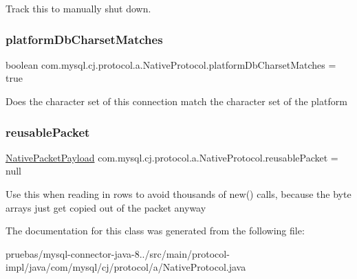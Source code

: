 Track this to manually shut down. \mbox{\label{classcom_1_1mysql_1_1cj_1_1protocol_1_1a_1_1_native_protocol_af023799e47c29f6821440c5b60fba820}} 
\subsubsection{\texorpdfstring{platform\+Db\+Charset\+Matches}{platformDbCharsetMatches}}
{\footnotesize\ttfamily boolean com.\+mysql.\+cj.\+protocol.\+a.\+Native\+Protocol.\+platform\+Db\+Charset\+Matches = true\hspace{0.3cm}{\ttfamily [protected]}}

Does the character set of this connection match the character set of the platform \mbox{\label{classcom_1_1mysql_1_1cj_1_1protocol_1_1a_1_1_native_protocol_a3cbc16a90deb548d74da81685a49216d}} 
\subsubsection{\texorpdfstring{reusable\+Packet}{reusablePacket}}
{\footnotesize\ttfamily \mbox{\hyperlink{classcom_1_1mysql_1_1cj_1_1protocol_1_1a_1_1_native_packet_payload}{Native\+Packet\+Payload}} com.\+mysql.\+cj.\+protocol.\+a.\+Native\+Protocol.\+reusable\+Packet = null\hspace{0.3cm}{\ttfamily [protected]}}

Use this when reading in rows to avoid thousands of new() calls, because the byte arrays just get copied out of the packet anyway 

The documentation for this class was generated from the following file\+:\begin{DoxyCompactItemize}
\item 
pruebas/mysql-\/connector-\/java-\/8../src/main/protocol-\/impl/java/com/mysql/cj/protocol/a/Native\+Protocol.\+java\end{DoxyCompactItemize}
